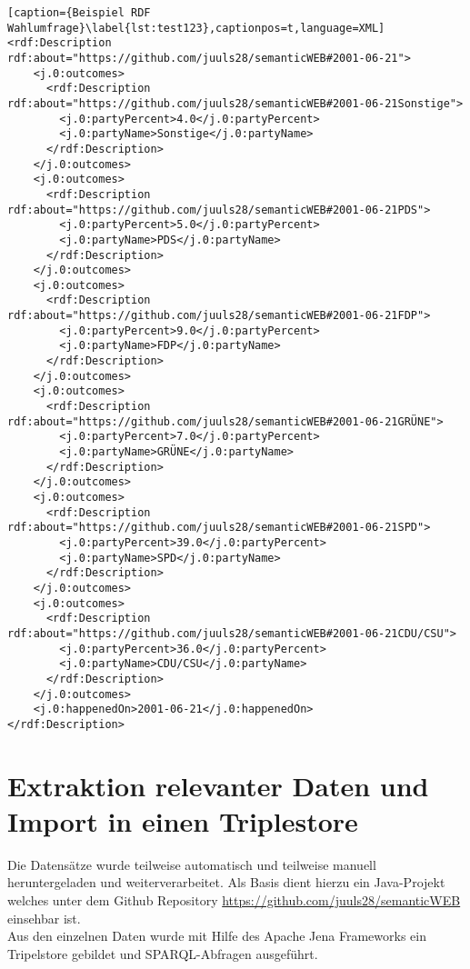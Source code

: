 \documentclass[a4paper,10pt,parskip]{article}
\begin{document}
\begin{lstlisting}[caption={Beispiel RDF Wahlumfrage}\label{lst:test123},captionpos=t,language=XML] 
<rdf:Description rdf:about="https://github.com/juuls28/semanticWEB#2001-06-21">
    <j.0:outcomes>
      <rdf:Description rdf:about="https://github.com/juuls28/semanticWEB#2001-06-21Sonstige">
        <j.0:partyPercent>4.0</j.0:partyPercent>
        <j.0:partyName>Sonstige</j.0:partyName>
      </rdf:Description>
    </j.0:outcomes>
    <j.0:outcomes>
      <rdf:Description rdf:about="https://github.com/juuls28/semanticWEB#2001-06-21PDS">
        <j.0:partyPercent>5.0</j.0:partyPercent>
        <j.0:partyName>PDS</j.0:partyName>
      </rdf:Description>
    </j.0:outcomes>
    <j.0:outcomes>
      <rdf:Description rdf:about="https://github.com/juuls28/semanticWEB#2001-06-21FDP">
        <j.0:partyPercent>9.0</j.0:partyPercent>
        <j.0:partyName>FDP</j.0:partyName>
      </rdf:Description>
    </j.0:outcomes>
    <j.0:outcomes>
      <rdf:Description rdf:about="https://github.com/juuls28/semanticWEB#2001-06-21GRÜNE">
        <j.0:partyPercent>7.0</j.0:partyPercent>
        <j.0:partyName>GRÜNE</j.0:partyName>
      </rdf:Description>
    </j.0:outcomes>
    <j.0:outcomes>
      <rdf:Description rdf:about="https://github.com/juuls28/semanticWEB#2001-06-21SPD">
        <j.0:partyPercent>39.0</j.0:partyPercent>
        <j.0:partyName>SPD</j.0:partyName>
      </rdf:Description>
    </j.0:outcomes>
    <j.0:outcomes>
      <rdf:Description rdf:about="https://github.com/juuls28/semanticWEB#2001-06-21CDU/CSU">
        <j.0:partyPercent>36.0</j.0:partyPercent>
        <j.0:partyName>CDU/CSU</j.0:partyName>
      </rdf:Description>
    </j.0:outcomes>
    <j.0:happenedOn>2001-06-21</j.0:happenedOn>
</rdf:Description>
\end{lstlisting}

\section{Extraktion relevanter Daten und Import in einen Triplestore }

Die Datensätze wurde teilweise automatisch und teilweise manuell heruntergeladen und weiterverarbeitet. Als Basis dient hierzu ein Java-Projekt welches unter dem Github Repository \url{https://github.com/juuls28/semanticWEB} einsehbar ist.\\
Aus den einzelnen Daten wurde mit Hilfe des Apache Jena Frameworks ein Tripelstore gebildet und SPARQL-Abfragen ausgeführt.
\newpage
\end{document}
